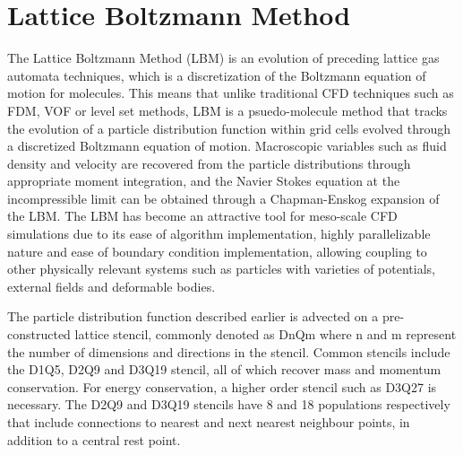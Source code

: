 \section{Lattice Boltzmann Method}

The Lattice Boltzmann Method (LBM) is an evolution of preceding lattice gas automata techniques, which is a discretization of the Boltzmann equation of motion for 
molecules. This means that unlike traditional CFD techniques such as FDM, VOF or level set methods, LBM is a psuedo-molecule method that tracks the evolution of a 
particle distribution function within grid cells evolved through a discretized Boltzmann equation of motion. Macroscopic variables such as fluid density and 
velocity are recovered from the particle distributions through appropriate moment integration, and the Navier Stokes equation at the incompressible limit can be 
obtained through a Chapman-Enskog expansion of the LBM. The LBM has become an attractive tool for meso-scale CFD simulations due to its ease of algorithm 
implementation, highly parallelizable nature and ease of boundary condition implementation, allowing coupling to other physically relevant systems such as 
particles with varieties of potentials, external fields and deformable bodies.

The particle distribution function described earlier is advected on a pre-constructed lattice stencil, commonly denoted as DnQm where n and m represent the 
number of dimensions and directions in the stencil. Common stencils include the D1Q5, D2Q9 and D3Q19 stencil, all of which recover mass and momentum conservation. 
For energy conservation, a higher order stencil such as D3Q27 is necessary. The D2Q9 and D3Q19 stencils have 8 and 18 populations respectively that include 
connections to nearest and next nearest neighbour points, in addition to a central rest point. 

